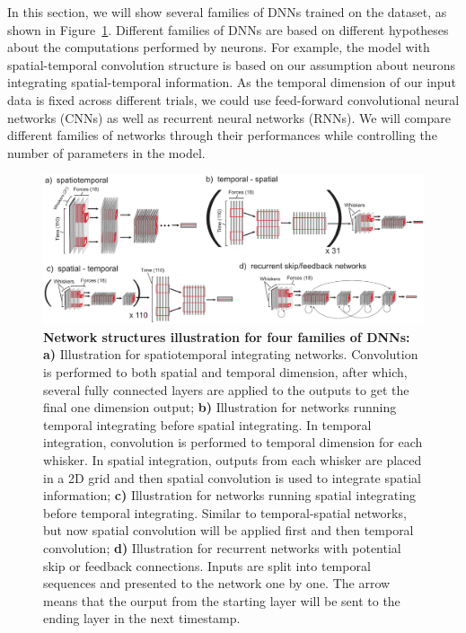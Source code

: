 In this section, we will show several families of DNNs trained on the dataset, as shown in Figure~\ref{fig_archi}. Different families of DNNs are based on different hypotheses about the computations performed by neurons.
For example, the model with spatial-temporal convolution structure is based on our assumption about neurons integrating spatial-temporal information.
As the temporal dimension of our input data is fixed across different trials, we could use feed-forward convolutional neural networks (CNNs) as well as recurrent neural networks (RNNs).
We will compare different families of networks through their performances while controlling the number of parameters in the model.

\begin{figure}[h]
\centering
\includegraphics [width=1\linewidth]{figures/architectures.pdf}
\vspace{-2mm}
\caption{\textbf{Network structures illustration for four families of DNNs:} \textbf{a)} Illustration for spatiotemporal integrating networks. Convolution is performed to both spatial and temporal dimension, after which, several fully connected layers are applied to the outputs to get the final one dimension output; \textbf{b)} Illustration for networks running temporal integrating before spatial integrating. In temporal integration, convolution is performed to temporal dimension for each whisker. In spatial integration, outputs from each whisker are placed in a 2D grid and then spatial convolution is used to integrate spatial information; \textbf{c)} Illustration for networks running spatial integrating before temporal integrating. Similar to temporal-spatial networks, but now spatial convolution will be applied first and then temporal convolution; \textbf{d)} Illustration for recurrent networks with potential skip or feedback connections. Inputs are split into temporal sequences and presented to the network one by one. The arrow means that the ourput from the starting layer will be sent to the ending layer in the next timestamp.~\label{fig_archi}}
\end{figure}

